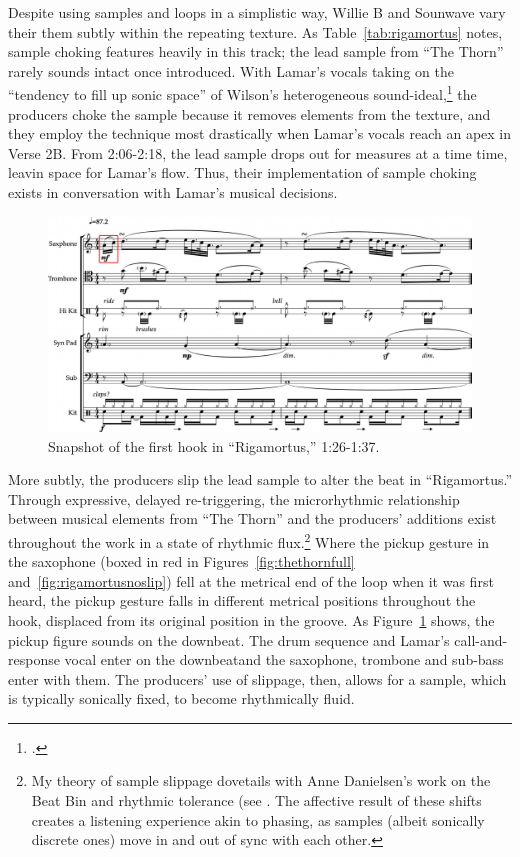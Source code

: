 Despite using samples and loops in a simplistic way, Willie B and Sounwave vary their them
subtly within the repeating texture. As Table~\ref{tab:rigamortus} notes, sample choking
features heavily in this track; the lead sample from ``The Thorn'' rarely sounds intact once
introduced. With Lamar's vocals taking on the ``tendency to fill up sonic space'' of Wilson's
heterogeneous sound-ideal,\footnote{
    \autocite[328]{ollywilsonHeterogeneousSoundIdeal1992}.} 
the producers choke the sample because it removes elements from the texture, and they employ
the technique most drastically when Lamar's vocals reach an apex in Verse 2B. From 2:06-2:18,
the lead sample drops out for measures at a time time, leavin space for Lamar's flow. Thus,
their implementation of sample choking exists in conversation with Lamar's musical decisions.

\begin{figure}[htp]
    \centering
    \includegraphics[width=\textwidth]{images/figures/chp 02/126137rigamortusslip.pdf}
    \caption{Snapshot of the first hook in ``Rigamortus,'' 1:26-1:37.}
    \label{fig:rigamortusslip}
\end{figure}

More subtly, the producers slip the lead sample to alter the beat in ``Rigamortus.'' Through
expressive, delayed re-triggering, the microrhythmic relationship between musical elements from
``The Thorn'' and the producers' additions exist throughout the work in a state of rhythmic 
flux.\footnote{
    My theory of sample slippage dovetails with Anne Danielsen's work on the Beat Bin and 
    rhythmic tolerance (see \autocite[29\textit{ff}.]{annedanielsenHereThereEverywhere2016}. 
    The affective result of these shifts creates a listening experience akin to phasing, 
    as samples (albeit sonically discrete ones) move in and out of sync with each other.}
Where the pickup gesture in the saxophone (boxed in red in Figures~\ref{fig:thethornfull}
and~\ref{fig:rigamortusnoslip}) fell at the metrical end of the loop when it was first heard,
the pickup gesture falls in different metrical positions throughout the hook, displaced from
its original position in the groove. As Figure~\ref{fig:rigamortusslip} shows, the pickup 
figure sounds on the downbeat. The drum sequence and Lamar's call-and-response vocal enter 
on the downbeat\textemdash and the saxophone, trombone and sub-bass enter with them. The 
producers' use of slippage, then, allows for a sample, which is typically sonically fixed,
to become rhythmically fluid.

